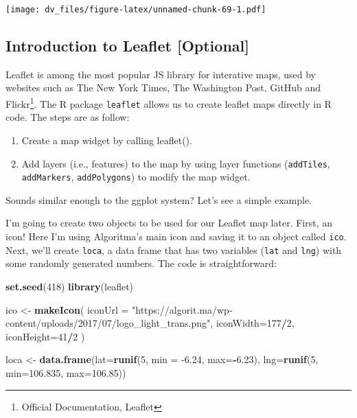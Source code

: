 \documentclass[]{article}
\newenvironment{Shaded}{\begin{snugshade}}{\end{snugshade}}
\newcommand{\DataTypeTok}[1]{\textcolor[rgb]{0.13,0.29,0.53}{#1}}
\newcommand{\DecValTok}[1]{\textcolor[rgb]{0.00,0.00,0.81}{#1}}
\newcommand{\FloatTok}[1]{\textcolor[rgb]{0.00,0.00,0.81}{#1}}
\newcommand{\KeywordTok}[1]{\textcolor[rgb]{0.13,0.29,0.53}{\textbf{#1}}}
\newcommand{\NormalTok}[1]{#1}
\newcommand{\OperatorTok}[1]{\textcolor[rgb]{0.81,0.36,0.00}{\textbf{#1}}}
\newcommand{\StringTok}[1]{\textcolor[rgb]{0.31,0.60,0.02}{#1}}
\providecommand{\tightlist}{%
  \setlength{\itemsep}{0pt}\setlength{\parskip}{0pt}}
\begin{document}
\texttt{[image: dv\_files/figure-latex/unnamed-chunk-69-1.pdf]}

\hypertarget{introduction-to-leaflet-optional}{%
\subsection{Introduction to Leaflet
{[}Optional{]}}\label{introduction-to-leaflet-optional}}

Leaflet is among the most popular JS library for interative maps, used
by websites such as The New York Times, The Washington Post, GitHub and
Flickr\footnote{Official Documentation, Leaflet}. The R package
\texttt{leaflet} allows us to create leaflet maps directly in R code.
The steps are as follow:

\begin{enumerate}
\def\labelenumi{\arabic{enumi}.}
\tightlist
\item
  Create a map widget by calling leaflet().\\
\item
  Add layers (i.e., features) to the map by using layer functions
  (\texttt{addTiles}, \texttt{addMarkers}, \texttt{addPolygons}) to
  modify the map widget.
\end{enumerate}

Sounds similar enough to the ggplot system? Let's see a simple example.

I'm going to create two objects to be used for our Leaflet map later.
First, an icon! Here I'm using Algoritma's main icon and saving it to an
object called \texttt{ico}. Next, we'll create \texttt{loca}, a data
frame that has two variables (\texttt{lat} and \texttt{lng}) with some
randomly generated numbers. The code is straightforward:

\begin{Shaded}
\begin{Highlighting}[]
\KeywordTok{set.seed}\NormalTok{(}\DecValTok{418}\NormalTok{)}
\KeywordTok{library}\NormalTok{(leaflet)}

\NormalTok{ico <-}\StringTok{ }\KeywordTok{makeIcon}\NormalTok{(}
    \DataTypeTok{iconUrl =} \StringTok{"https://algorit.ma/wp-content/uploads/2017/07/logo_light_trans.png"}\NormalTok{,}
    \DataTypeTok{iconWidth=}\DecValTok{177}\OperatorTok{/}\DecValTok{2}\NormalTok{, }\DataTypeTok{iconHeight=}\DecValTok{41}\OperatorTok{/}\DecValTok{2}
\NormalTok{)}


\NormalTok{loca <-}\StringTok{ }\KeywordTok{data.frame}\NormalTok{(}\DataTypeTok{lat=}\KeywordTok{runif}\NormalTok{(}\DecValTok{5}\NormalTok{, }\DataTypeTok{min =} \FloatTok{-6.24}\NormalTok{, }\DataTypeTok{max=}\OperatorTok{-}\FloatTok{6.23}\NormalTok{),}
                   \DataTypeTok{lng=}\KeywordTok{runif}\NormalTok{(}\DecValTok{5}\NormalTok{, }\DataTypeTok{min=}\FloatTok{106.835}\NormalTok{, }\DataTypeTok{max=}\FloatTok{106.85}\NormalTok{))}
\end{Highlighting}
\end{Shaded}
\end{document}
